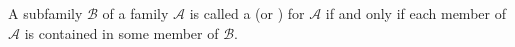 A subfamily $\mathcal{B}$ of a family $\mathcal{A}$ is called a  (or ) for $\mathcal{A}$ if and only if each member of $\mathcal{A}$ is contained in some member of $\mathcal{B}$.
